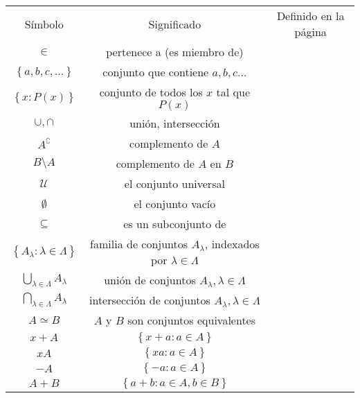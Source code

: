 \documentclass[a4,paper]{article}
\begin{document}
\begin{tabular}{ccc}
		Símbolo & Significado & Definido en la página \\
		$\in$  & pertenece a (es miembro de) & \\
		$\left\{a,b,c,\ldots\right\}$ & conjunto que contiene $a,b,c\ldots$ &\\
		$\left\{x:P(x)\right\}$ & conjunto de todos los $x$ tal que $P(x)$ & \\
		$\cup,\cap$ & unión, intersección & \\
		$A^{\complement}$ & complemento de $A$ & \\
		$B\setminus A$ & complemento de $A$ en $B$ & \\
		$\mathcal{U}$ & el conjunto universal & \\
		$\emptyset$ & el conjunto vacío & \\
		$\subseteq$ & es un subconjunto de & \\
		$\left\{A_{\lambda}:\lambda\in\Lambda\right\}$ & familia de conjuntos $A_{\lambda}$, indexados por $\lambda\in\Lambda$ \\
		$\bigcup_{\lambda\in\Lambda}A_{\lambda}$ & unión de conjuntos $A_{\lambda},\lambda\in\Lambda$ \\
		$\bigcap_{\lambda\in\Lambda}A_{\lambda}$ & intersección de conjuntos $A_{\lambda},\lambda\in\Lambda$ \\
		$A\simeq B$ & $A$ y $B$ son conjuntos equivalentes \\
		$x+A$ & $\left\{x+a:a\in A\right\}$ & \\
		$xA$ & $\left\{xa:a\in A\right\}$ & \\
		$-A$ & $\left\{-a:a\in A\right\}$ & \\
		$A+B$ & $\left\{a+b:a\in A, b\in B\right\}$ & \\
\end{tabular}
\end{document}
